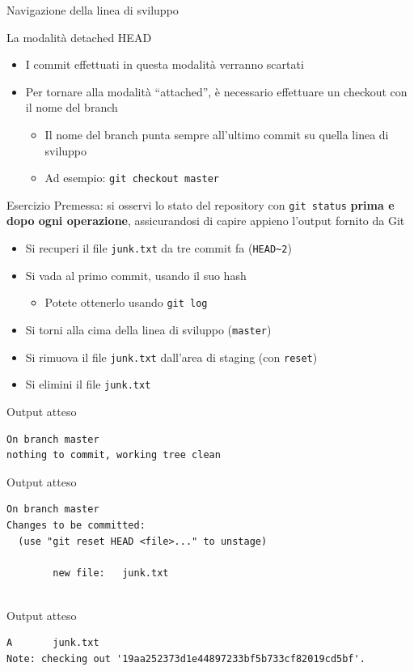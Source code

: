 \documentclass[presentation]{beamer}
\begin{document}
\begin{frame}{Navigazione della linea di sviluppo}
\begin{block}{La modalità detached HEAD}
		\begin{itemize}
			\item I commit effettuati in questa modalità verranno scartati
			\item Per tornare alla modalità ``attached'', è necessario effettuare un checkout con il nome del branch
			\begin{itemize}
				\item Il nome del branch punta sempre all'ultimo commit su quella linea di sviluppo
				\item Ad esempio: \texttt{git checkout master}
			\end{itemize}
		\end{itemize}
	\end{block}
	\begin{block}{Esercizio}	
		Premessa: si osservi lo stato del repository con \texttt{git status} \textbf{prima e dopo ogni operazione}, assicurandosi di capire appieno l'output fornito da Git
		\begin{itemize}
			\item Si recuperi il file \texttt{junk.txt} da tre commit fa (\texttt{HEAD\textasciitilde{}2})
			\item Si vada al primo commit, usando il suo hash
			\begin{itemize}
				\item Potete ottenerlo usando \texttt{git log}
			\end{itemize}
			\item Si torni alla cima della linea di sviluppo (\texttt{master})
			\item Si rimuova il file \texttt{junk.txt} dall'area di staging (con \texttt{reset})
			\item Si elimini il file \texttt{junk.txt}
		\end{itemize}
	\end{block}
	\begin{block}{Output atteso}
		\begin{Verbatim}[fontsize=\scriptsize]
On branch master
nothing to commit, working tree clean
		\end{Verbatim}
	\end{block}
	\begin{block}{Output atteso}
		\begin{Verbatim}[fontsize=\scriptsize]
On branch master
Changes to be committed:
  (use "git reset HEAD <file>..." to unstage)

        new file:   junk.txt


		\end{Verbatim}
	\end{block}
	\begin{block}{Output atteso}
		\begin{Verbatim}[fontsize=\scriptsize]
A       junk.txt
Note: checking out '19aa252373d1e44897233bf5b733cf82019cd5bf'.


\end{Verbatim}
\end{block}
\end{frame}
\end{document}
